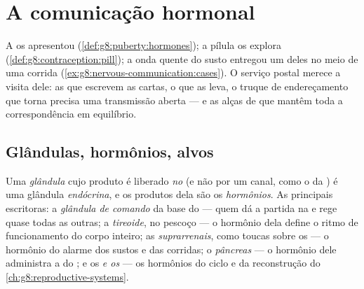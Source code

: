\chapter{A comunicação hormonal}\label{ch:g8:hormonal-communication}

A  os apresentou
(\cref{def:g8:puberty:hormones}); a pílula os explora
(\cref{def:g8:contraception:pill}); a onda quente do susto entregou um
deles no meio de uma corrida
(\cref{ex:g8:nervous-communication:cases}). O serviço postal merece a
visita dele: as  que escrevem as cartas, o  que as
leva, o truque de endereçamento que torna precisa uma transmissão
aberta --- e as alças de  que mantêm toda a
correspondência em equilíbrio.

\section{Glândulas, hormônios, alvos}

\begin{definition}\label{def:g8:hormonal-communication:glands}
Uma \emph{glândula} cujo produto é liberado \emph{no
} (e não por um canal, como o da ) é uma glândula
\emph{endócrina}, e os produtos dela são os
\emph{hormônios}. As principais escritoras: a
\emph{glândula de comando} da base do  --- quem dá a partida na
 e rege quase todas as outras; a \emph{tireoide}, no pescoço
--- o hormônio dela define o ritmo de funcionamento do corpo inteiro; as
\emph{suprarrenais}, como toucas sobre os  --- o hormônio do alarme
dos sustos e das corridas; o \emph{pâncreas} --- o hormônio dele
administra a  do ; e os \emph{ e os } ---
os hormônios do ciclo e da reconstrução do
\cref{ch:g8:reproductive-systems}.
\end{definition}

